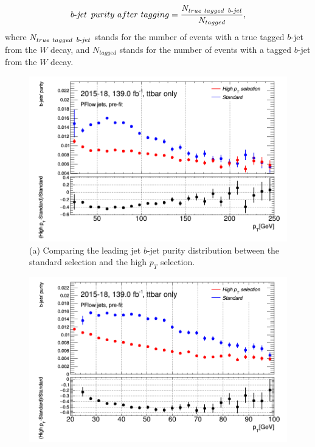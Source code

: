 \documentclass[letterpaper,12pt]{article}
\newcommand\bjetineq{\mathop{\mbox{$b$-$\mathit{jet}$}}}
\newcommand\bjetunder{\mathop{\footnotesize{\mbox{$b$-$\mathit{jet}$}}}\normalsize}
\begin{document}
\begin{equation}
\bjetineq\ purity\ after\ tagging= \frac{N_{true\ tagged\ \bjetunder}}{N_{tagged}},
\end{equation}
where $N_{true\ tagged\ \bjetunder}$ stands for the number of events with a true tagged $b$-jet from the $W$ decay, and $N_{tagged}$ stands for the number of events with a tagged $b$-jet from the $W$ decay.
\begin{figure}[H]
\centering
\begin{minipage}[b]{.45\textwidth}
\centering
\includegraphics[width=1\textwidth]{b_purity/_stats_bjets_purityp_Tjet0GeV.png}
\footnotesize (a) Comparing the leading jet $b$-jet purity distribution between the standard selection and the high $p_T$ selection.\label{fig:b_after_leading}
\end{minipage}\hfill
\begin{minipage}[b]{.45\textwidth}
\centering
\includegraphics[width=1\textwidth]{b_purity/_stats_bjets_purityp_Tjet1GeV.png}

\end{minipage}
\end{figure}
\end{document}
